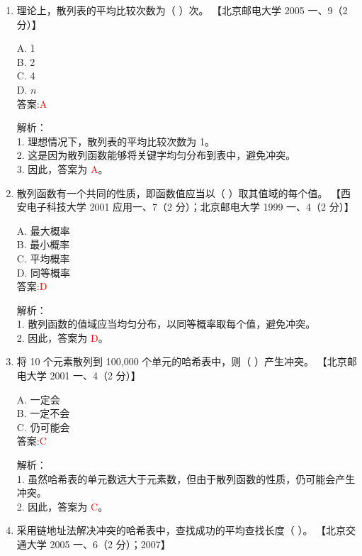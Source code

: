 \documentclass[lang=cn,newtx,10pt,scheme=chinese]{../../../elegantbook}
\begin{document}
\begin{enumerate}
\item 理论上，散列表的平均比较次数为（ ）次。  
    【北京邮电大学 2005 一、9（2 分）】  

    A. 1 \\  
    B. 2 \\  
    C. 4 \\  
    D. $n$ \\  

    答案:\textcolor{red}{A}

    解析：\\
    1. 理想情况下，散列表的平均比较次数为 1。\\
    2. 这是因为散列函数能够将关键字均匀分布到表中，避免冲突。\\
    3. 因此，答案为 \textcolor{red}{A}。\\

\item 散列函数有一个共同的性质，即函数值应当以（ ）取其值域的每个值。  
    【西安电子科技大学 2001 应用一、7（2 分）；北京邮电大学 1999 一、4（2 分）】  

    A. 最大概率 \\  
    B. 最小概率 \\  
    C. 平均概率 \\  
    D. 同等概率 \\  

    答案:\textcolor{red}{D}

    解析：\\
    1. 散列函数的值域应当均匀分布，以同等概率取每个值，避免冲突。\\
    2. 因此，答案为 \textcolor{red}{D}。\\

\item 将 10 个元素散列到 100,000 个单元的哈希表中，则（ ）产生冲突。  
    【北京邮电大学 2001 一、4（2 分）】  

    A. 一定会 \\  
    B. 一定不会 \\  
    C. 仍可能会 \\  

    答案:\textcolor{red}{C}

    解析：\\
    1. 虽然哈希表的单元数远大于元素数，但由于散列函数的性质，仍可能会产生冲突。\\
    2. 因此，答案为 \textcolor{red}{C}。\\

\item 采用链地址法解决冲突的哈希表中，查找成功的平均查找长度（ ）。  
    【北京交通大学 2005 一、6（2 分）；2007】  


\end{enumerate}
\end{document}
